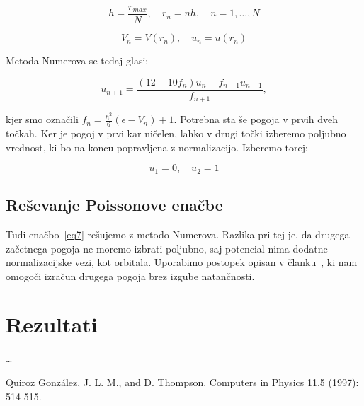 \documentclass[a4paper]{article}
\begin{document}
    \begin{equation}\label{eq12}
        h = \frac{r_{max}}{N}, \quad r_n = nh, \quad n = 1, \ldots, N
    \end{equation}

    \begin{equation}\label{eq13}
        V_n = V(r_n), \quad u_n = u(r_n)
    \end{equation}

    Metoda Numerova se tedaj glasi:

    \begin{equation}\label{eq14}
        u_{n+1} = \frac{(12 - 10f_n)u_n - f_{n-1}u_{n-1}}{f_{n+1}},
    \end{equation}

    kjer smo označili $f_n = \frac{h^2}{6} (\epsilon - V_n) + 1$.
    Potrebna sta še pogoja v prvih dveh točkah.
    Ker je pogoj v prvi kar ničelen, lahko v drugi točki izberemo poljubno vrednost, ki bo na koncu popravljena z
    normalizacijo.
    Izberemo torej:

    \begin{equation}\label{eq15}
        u_1 = 0, \quad u_2 = 1
    \end{equation}

    \subsection{Reševanje Poissonove enačbe}

    Tudi enačbo~\ref{eq7} rešujemo z metodo Numerova.
    Razlika pri tej je, da drugega začetnega pogoja ne moremo izbrati poljubno, saj potencial nima dodatne
    normalizacijske vezi, kot orbitala.
    Uporabimo postopek opisan v članku~\cite{it1}, ki nam omogoči izračun drugega pogoja brez izgube natančnosti.

    \section{Rezultati}

    \ldots

    \iffalse
    \begin{figure}
        \centering
        \texttt{[image: slika1.pdf]}
        \caption{Energije verige preračunane na delec. Najnižja vrednost, do katere pridemo na grafu je $E_0/n \approx -1.767$}
        \label{slika1}
    \end{figure}

    \begin{figure}
        \centering
        \begin{subfigure}{\textwidth}
            \texttt{[image: slika3a.pdf]}
        \end{subfigure}
        \begin{subfigure}{\textwidth}
            \texttt{[image: slika3b.pdf]}
        \end{subfigure}
        \caption{Prikaza matrik spinskih korelacij v osnovnem stanju dveh različno dolgih verig.}
        \label{slika3}
    \end{figure}
    \fi

    \begin{thebibliography}{9}
        Quiroz González, J. L. M., and D. Thompson.
            Computers in Physics 11.5 (1997): 514-515.
    \end{thebibliography}
\end{document}
